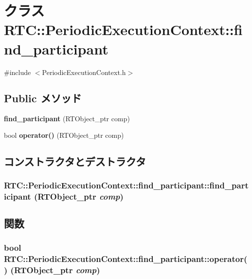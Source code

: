 \section{クラス RTC::PeriodicExecutionContext::find\_\-participant}
\label{classRTC_1_1PeriodicExecutionContext_1_1find__participant}


{\ttfamily \#include $<$PeriodicExecutionContext.h$>$}

\subsection*{Public メソッド}
\begin{DoxyCompactItemize}
\item 
{\bf find\_\-participant} (RTObject\_\-ptr comp)
\item 
bool {\bf operator()} (RTObject\_\-ptr comp)
\end{DoxyCompactItemize}


\subsection{コンストラクタとデストラクタ}
\subsubsection[{find\_\-participant}]{\setlength{\rightskip}{0pt plus 5cm}RTC::PeriodicExecutionContext::find\_\-participant::find\_\-participant (RTObject\_\-ptr {\em comp})\hspace{0.3cm}{\ttfamily  [inline]}}\label{classRTC_1_1PeriodicExecutionContext_1_1find__participant_a9a17ee3de46809d56fa740db0de63b95}


\subsection{関数}
\subsubsection[{operator()}]{\setlength{\rightskip}{0pt plus 5cm}bool RTC::PeriodicExecutionContext::find\_\-participant::operator() (RTObject\_\-ptr {\em comp})\hspace{0.3cm}{\ttfamily  [inline]}}\label{classRTC_1_1PeriodicExecutionContext_1_1find__participant_a8ff35c40d5e9998fd9516e675486f834}
